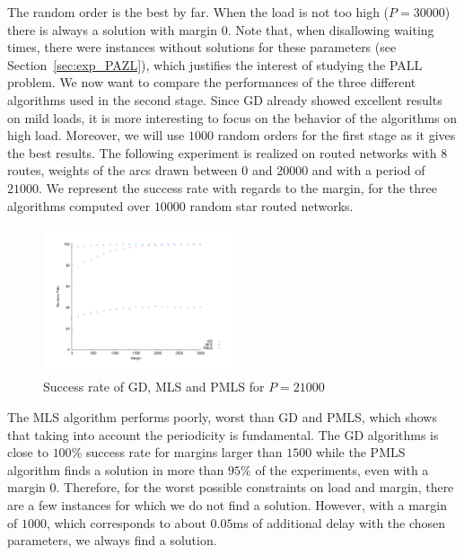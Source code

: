 \documentclass[10pt, conference, letterpaper]{IEEEtran}
\begin{document}
     The random order is the best by far. When the load is not too high ($P = 30000$) there is always a solution with margin $0$.
     Note that, when disallowing waiting times, there were instances without solutions for these parameters (see Section~\ref{sec:exp_PAZL}), which justifies the interest of studying the PALL problem. We now want to compare the performances of the three different algorithms used in the second stage. Since GD already showed excellent results on mild loads, it is more interesting to focus on the behavior of the algorithms on high load. Moreover, we will use $1000$ random orders for the first stage as it gives the best results. The following experiment is realized on routed networks with $8$ routes, weights of the arcs drawn between $0$ and $20000$ and with a period of $21000$.  We represent the success rate with regards to the margin, for the three algorithms computed over $10000$ random star routed networks. 
   

 
    \begin{figure} [H] 
       \begin{center}
      \includegraphics[width=0.5\textwidth]{retour_21000.pdf}
      \end{center}
      \caption{Success rate of GD, MLS and PMLS for $P = 21000$}
     \label{fig:success21000}
     \end{figure}
     
     The MLS algorithm performs poorly, worst than GD and PMLS, which shows that taking into account the periodicity is fundamental.
     The GD algorithms is close to $100\%$ success rate for margins larger than $1500$ while the PMLS algorithm finds a solution in more than $95\%$ of the experiments, even with a margin $0$. Therefore, for the worst possible constraints on load and margin, there are a few instances for which we do not find a solution. However, with a margin of $1000$, which corresponds to about $0.05$ms of additional delay with the chosen parameters, we always find a solution. 
     
\end{document}
